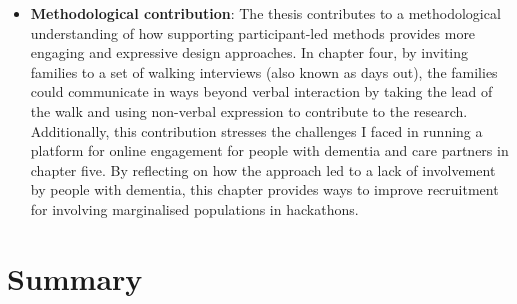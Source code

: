 \begin{itemize}
    \item \textbf{Methodological contribution}:  The thesis contributes to a methodological understanding of how supporting participant-led methods provides more engaging and expressive design approaches. In chapter four, by inviting families to a set of walking interviews (also known as days out), the families could communicate in ways beyond verbal interaction by taking the lead of the walk and using non-verbal expression to contribute to the research. Additionally, this contribution stresses the challenges I faced in running a platform for online engagement for people with dementia and care partners in chapter five. By reflecting on how the approach led to a lack of involvement by people with dementia, this chapter provides ways to improve recruitment for involving marginalised populations in hackathons.


\end{itemize}


\section{Summary}
\label{Intro: Summary}